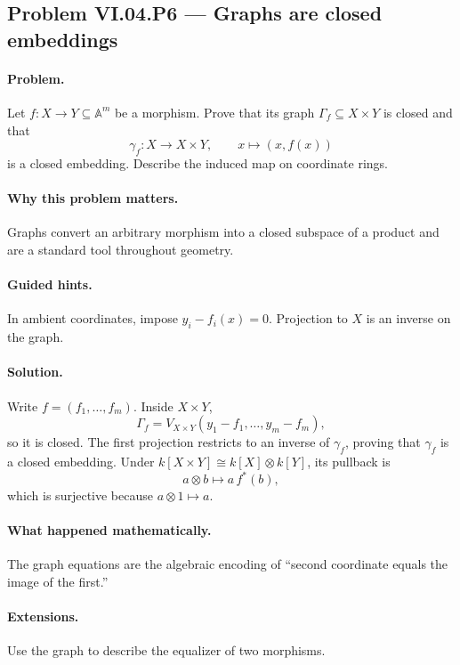 \subsection*{Problem VI.04.P6 --- Graphs are closed embeddings}
\label{prob:vi04-p6}
\paragraph{Problem.}
Let \(f:X\to Y\subseteq\mathbb A^m\) be a morphism.  Prove that its graph
\(\Gamma_f\subseteq X\times Y\) is closed and that
\[
\gamma_f:X\to X\times Y,\qquad x\mapsto(x,f(x))
\]
is a closed embedding.  Describe the induced map on coordinate rings.
\ifdefined\FullProblemDossiers
\paragraph{Why this problem matters.}  Graphs convert an arbitrary morphism into a closed
subspace of a product and are a standard tool throughout geometry.
\paragraph{Guided hints.}  In ambient coordinates, impose \(y_i-f_i(x)=0\).  Projection to
\(X\) is an inverse on the graph.
\paragraph{Solution.}
Write \(f=(f_1,\dots,f_m)\).  Inside \(X\times Y\),
\[
\Gamma_f=V_{X\times Y}(y_1-f_1,\dots,y_m-f_m),
\]
so it is closed.  The first projection restricts to an inverse of \(\gamma_f\), proving
that \(\gamma_f\) is a closed embedding.  Under
\(k[X\times Y]\cong k[X]\otimes k[Y]\), its pullback is
\[
a\otimes b\longmapsto a\,f^*(b),
\]
which is surjective because \(a\otimes1\mapsto a\).
\paragraph{What happened mathematically.}  The graph equations are the algebraic encoding
of ``second coordinate equals the image of the first.''
\paragraph{Extensions.}  Use the graph to describe the equalizer of two morphisms.
\fi
